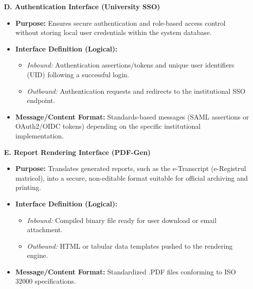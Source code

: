 \documentclass[11pt, a4paper]{article}
\begin{document}
\textbf{D. Authentication Interface (University SSO)}
\begin{itemize}
    \item \textbf{Purpose:} Ensures secure authentication and role-based access control without storing local user credentials within the system database.
    \item \textbf{Interface Definition (Logical):}
    \begin{itemize}
        \item \textit{Inbound:} Authentication assertions/tokens and unique user identifiers (UID) following a successful login.
        \item \textit{Outbound:} Authentication requests and redirects to the institutional SSO endpoint.
    \end{itemize}
    \item \textbf{Message/Content Format:} Standards-based messages (SAML assertions or OAuth2/OIDC tokens) depending on the specific institutional implementation.
\end{itemize}

\textbf{E. Report Rendering Interface (PDF-Gen)}
\begin{itemize}
    \item \textbf{Purpose:} Translates generated reports, such as the e-Transcript (e-Registrul matricol), into a secure, non-editable format suitable for official archiving and printing.
    \item \textbf{Interface Definition (Logical):}
    \begin{itemize}
        \item \textit{Inbound:} Compiled binary file ready for user download or email attachment.
        \item \textit{Outbound:} HTML or tabular data templates pushed to the rendering engine.
    \end{itemize}
    \item \textbf{Message/Content Format:} Standardized .PDF files conforming to ISO 32000 specifications.
\end{itemize}
\end{document}
